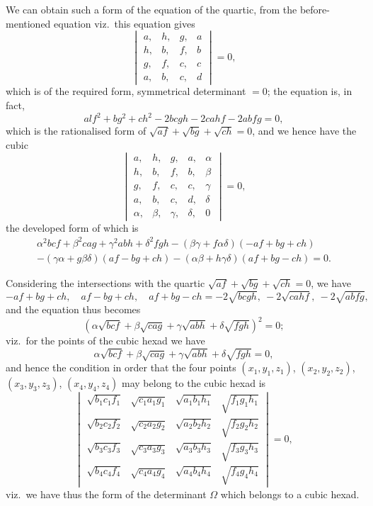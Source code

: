 \documentclass[11pt,a4paper]{article}
\begin{document}
We can obtain such a form of the equation of the quartic, from the before-mentioned equation viz.\ this equation gives
\[
\begin{vmatrix}
a, & h, & g, & a \\
h, & b, & f, & b \\
g, & f, & c, & c \\
a, & b, & c, & d
\end{vmatrix}
= 0,
\]
which is of the required form, symmetrical determinant $= 0$; the equation is, in fact,
\[
alf^2 + bg^2 + ch^2 - 2bcgh - 2cahf - 2abfg = 0,
\]
which is the rationalised form of $\sqrt{af} + \sqrt{bg} + \sqrt{ch} = 0$, and we hence have the cubic
\[
\begin{vmatrix}
a, & h, & g, & a, & \alpha \\
h, & b, & f, & b, & \beta \\
g, & f, & c, & c, & \gamma \\
a, & b, & c, & d, & \delta \\
\alpha, & \beta, & \gamma, & \delta, & 0
\end{vmatrix}
= 0,
\]
the developed form of which is
\begin{multline*}
\alpha^2bcf + \beta^2cag + \gamma^2abh + \delta^2fgh - (\beta\gamma + f\alpha\delta)(-af + bg + ch) \\
- (\gamma\alpha + g\beta\delta)(af - bg + ch) - (\alpha\beta + h\gamma\delta)(af + bg - ch) = 0.
\end{multline*}

Considering the intersections with the quartic $\sqrt{af} + \sqrt{bg} + \sqrt{ch} = 0$, we have
\[
-af + bg + ch, \quad af - bg + ch, \quad af + bg - ch = -2\sqrt{bcgh}, \ -2\sqrt{cahf}, \ -2\sqrt{abfg},
\]
and the equation thus becomes
\[
(\alpha\sqrt{bcf} + \beta\sqrt{cag} + \gamma\sqrt{abh} + \delta\sqrt{fgh})^2 = 0;
\]
viz.\ for the points of the cubic hexad we have
\[
\alpha\sqrt{bcf} + \beta\sqrt{cag} + \gamma\sqrt{abh} + \delta\sqrt{fgh} = 0,
\]
and hence the condition in order that the four points $(x_1, y_1, z_1)$, $(x_2, y_2, z_2)$, $(x_3, y_3, z_3)$, $(x_4, y_4, z_4)$ may belong to the cubic hexad is
\[
\begin{vmatrix}
\sqrt{b_1c_1f_1} & \sqrt{c_1a_1g_1} & \sqrt{a_1b_1h_1} & \sqrt{f_1g_1h_1} \\
\sqrt{b_2c_2f_2} & \sqrt{c_2a_2g_2} & \sqrt{a_2b_2h_2} & \sqrt{f_2g_2h_2} \\
\sqrt{b_3c_3f_3} & \sqrt{c_3a_3g_3} & \sqrt{a_3b_3h_3} & \sqrt{f_3g_3h_3} \\
\sqrt{b_4c_4f_4} & \sqrt{c_4a_4g_4} & \sqrt{a_4b_4h_4} & \sqrt{f_4g_4h_4}
\end{vmatrix}
= 0,
\]
viz.\ we have thus the form of the determinant $\Omega$ which belongs to a cubic hexad.
\end{document}
